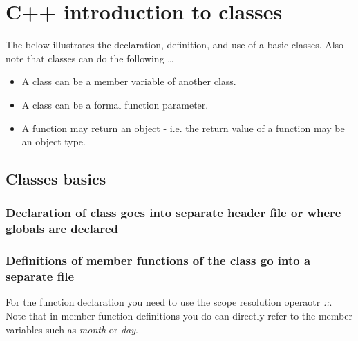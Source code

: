 \section{C++ introduction to classes}

The below illustrates the declaration, definition, and use of a basic classes. Also note that
classes can do the following \ldots

\begin{itemize}
	\item A class can be a member variable of another class.
	\item A class can be a formal function parameter.
	\item A function may return an object - i.e. the return value of a function may be
	an object type.
\end{itemize}

\subsection{Classes basics}

\subsubsection*{Declaration of class goes into separate header file or where globals are declared}



\subsubsection*{Definitions of member functions of the class go into a separate file}
For the function declaration you need to use the scope resolution operaotr \emph{::}.
Note that in member function definitions you do can directly refer to the member 
variables such as \emph{month} or \emph{day}.



